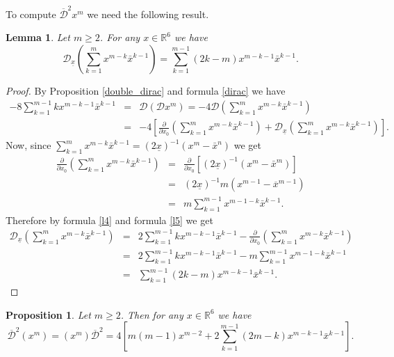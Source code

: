 \documentclass[reqno,11pt]{amsart}
\numberwithin{equation}{section}
\newtheorem{lemma}[theorem]{Lemma}
\newtheorem{proposition}[theorem]{Proposition}
\theoremstyle{definition}
\begin{document}
To compute $ \mathcal{\overline{D}}^2x^m$ we need the following result.
\begin{lemma}
\label{l7}
Let $m \geq 2$. For any $x \in \mathbb{R}^6$ we have
$$ \mathcal{D}_{\underline{x}} \left( \sum_{k=1}^m x^{m-k} \bar{x}^{k-1}\right)= \sum_{k=1}^{m-1}(2k-m) x^{m-k-1} \bar{x}^{k-1}.$$
\end{lemma}
\begin{proof}
By Proposition \ref{double_dirac}  and formula \eqref{dirac} we have
\begin{eqnarray}
\nonumber
-8 \sum_{k=1}^{m-1} k x^{m-k-1} \bar{x}^{k-1}&=& \mathcal{D}(\mathcal{D} x^m)=-4 \mathcal{D} \left(\sum_{k=1}^m x^{m-k} \bar{x}^{k-1}\right)\\
&=& -4 \left[ \frac{\partial}{\partial x_0}\left(\sum_{k=1}^m x^{m-k} \bar{x}^{k-1}\right)+ \mathcal{D}_{\underline{x}}\left(\sum_{k=1}^m x^{m-k} \bar{x}^{k-1}\right) \right]. \label{l4}
\end{eqnarray}
Now, since $\sum_{k=1}^m x^{m-k} \bar{x}^{k-1}= (2 \underline{x})^{-1}(x^m- \bar{x}^n)$ we get
\begin{eqnarray}
\nonumber
\frac{\partial}{\partial x_0}\left(\sum_{k=1}^m x^{m-k} \bar{x}^{k-1}\right) &=& \frac{\partial}{\partial x_0} \left[(2 \underline{x})^{-1}(x^m- \bar{x}^m)\right]\\
\nonumber
&=& (2 \underline{x})^{-1} m(x^{m-1} - \overline{x}^{m-1})\\
\label{l5}
&=& m \sum_{k=1}^{m-1} x^{m-1-k} \bar{x}^{k-1}.
\end{eqnarray}
Therefore by formula \eqref{l4} and formula \eqref{l5} we get
\begin{eqnarray*}
\mathcal{D}_{\underline{x}} \left( \sum_{k=1}^m x^{m-k} \bar{x}^{k-1}\right)&=& 2 \sum_{k=1}^{m-1} k x^{m-k-1} \bar{x}^{k-1}-\frac{\partial}{\partial x_0}\left(\sum_{k=1}^m x^{m-k} \bar{x}^{k-1}\right) \\
&=& 2 \sum_{k=1}^{m-1} k x^{m-k-1} \bar{x}^{k-1}-m \sum_{k=1}^{m-1} x^{m-1-k} \bar{x}^{k-1}\\
&=& \sum_{k=1}^{m-1} (2k-m) x^{m-k-1} \bar{x}^{k-1}.
\end{eqnarray*}
\end{proof}
\begin{proposition}
\label{antidouble}
Let $m \geq 2$. Then for any $x \in \mathbb{R}^6$ we have
\begin{equation}
\label{poly1}
\mathcal{\overline{D}}^2 (x^m)= (x^m)\mathcal{\overline{D}}^2=4 \left[m(m-1) x^{m-2}+2 \sum_{k=1}^{m-1} (2m-k)x^{m-k-1} \bar{x}^{k-1}\right].
\end{equation}
\end{proposition}
\end{document}
